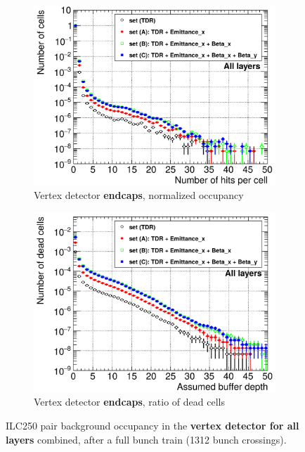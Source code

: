 \begin{figure}
  \begin{subfigure}[b]{0.49\textwidth}
   \centering
    \includegraphics[width=\textwidth]{Figures/Pairs/Occupancy_Comparison_All_layers_wrt_cells_ILC250_ALL_SETS_5T_w_antiDiD_SiVertexEndcap.png}
   \caption{Vertex detector \textbf{endcaps}, normalized occupancy}
   \end{subfigure}
   \hfill
    \begin{subfigure}[b]{0.49\textwidth}
   \centering
    \includegraphics[width=\textwidth]{Figures/Pairs/Occupancy_Comparison_All_layers_deadcells_ILC250_ALL_SETS_5T_w_antiDiD_SiVertexEndcap.png}
   \caption{Vertex detector \textbf{endcaps}, ratio of dead cells}
   \end{subfigure}
   \caption[Pair background occupancy in the \sid vertex detector for the ILC250]{ILC250 pair background occupancy in the \textbf{\sid vertex detector for all layers} combined, after a full bunch train (\num{1312} bunch crossings).
}
\end{figure}
